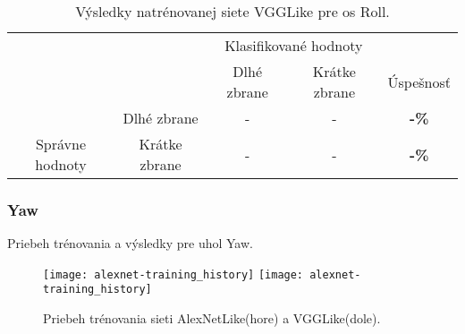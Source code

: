 \begin{table}[H]
    \centering
    \begin{tabular}{ccccc}
                                                                &                                    & \multicolumn{2}{c}{Klasifikované hodnoty}                                                         &                                    \\ \cline{3-5} 
                                                                & \multicolumn{1}{c|}{}              & \multicolumn{1}{c|}{Dlhé zbrane}                & \multicolumn{1}{c|}{Krátke zbrane}              & \multicolumn{1}{c|}{Úspešnosť}     \\ \cline{2-5} 
        \multicolumn{1}{c|}{}                                  & \multicolumn{1}{c|}{Dlhé zbrane}   & \multicolumn{1}{c|}{{\color[HTML]{009901} -}} & \multicolumn{1}{c|}{{\color[HTML]{9A0000} -}}  & \multicolumn{1}{c|}{\textbf{-\%}} \\ \cline{2-5} 
        \multicolumn{1}{c|}{\multirow{-2}{*}{Správne hodnoty}} & \multicolumn{1}{c|}{Krátke zbrane} & \multicolumn{1}{c|}{{\color[HTML]{9A0000} -}}  & \multicolumn{1}{c|}{{\color[HTML]{009901} -}} & \multicolumn{1}{c|}{\textbf{-\%}} \\ \cline{2-5} 
    \end{tabular}
    \caption{Výsledky natrénovanej siete VGGLike pre os Roll.}
    \label{tab:vgglikerollresults}
\end{table}

\subsubsection{Yaw}

Priebeh trénovania a výsledky pre uhol Yaw.

\begin{figure}[H]
    \centering
    \texttt{[image: alexnet-training\_history]} %
    \quad
	\texttt{[image: alexnet-training\_history]} %
	\caption{Priebeh trénovania sieti AlexNetLike(hore) a VGGLike(dole).}
	\label{pic:yawaxis}
\end{figure}

